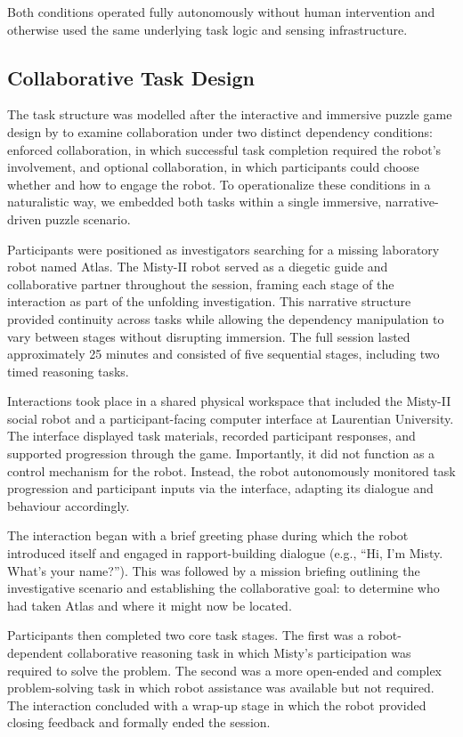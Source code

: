 \documentclass[
]{article}
\begin{document}
Both conditions operated fully autonomously without human intervention
and otherwise used the same underlying task logic and sensing
infrastructure.

\subsection{Collaborative Task Design}\label{collaborative-task-design}

The task structure was modelled after the interactive and immersive
puzzle game design by \textcite{lin2022} to examine collaboration under
two distinct dependency conditions: enforced collaboration, in which
successful task completion required the robot's involvement, and
optional collaboration, in which participants could choose whether and
how to engage the robot. To operationalize these conditions in a
naturalistic way, we embedded both tasks within a single immersive,
narrative-driven puzzle scenario.

Participants were positioned as investigators searching for a missing
laboratory robot named Atlas. The Misty-II robot served as a diegetic
guide and collaborative partner throughout the session, framing each
stage of the interaction as part of the unfolding investigation. This
narrative structure provided continuity across tasks while allowing the
dependency manipulation to vary between stages without disrupting
immersion. The full session lasted approximately 25 minutes and
consisted of five sequential stages, including two timed reasoning
tasks.

Interactions took place in a shared physical workspace that included the
Misty-II social robot and a participant-facing computer interface
\autocite{mistyrobotics} at Laurentian University. The interface
displayed task materials, recorded participant responses, and supported
progression through the game. Importantly, it did not function as a
control mechanism for the robot. Instead, the robot autonomously
monitored task progression and participant inputs via the interface,
adapting its dialogue and behaviour accordingly.

The interaction began with a brief greeting phase during which the robot
introduced itself and engaged in rapport-building dialogue (e.g., ``Hi,
I'm Misty. What's your name?''). This was followed by a mission briefing
outlining the investigative scenario and establishing the collaborative
goal: to determine who had taken Atlas and where it might now be
located.

Participants then completed two core task stages. The first was a
robot-dependent collaborative reasoning task in which Misty's
participation was required to solve the problem. The second was a more
open-ended and complex problem-solving task in which robot assistance
was available but not required. The interaction concluded with a wrap-up
stage in which the robot provided closing feedback and formally ended
the session.
\end{document}
